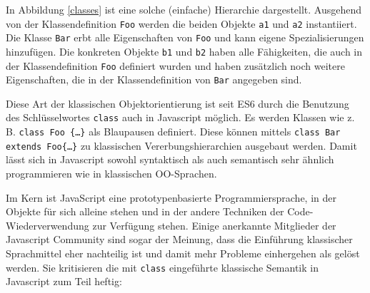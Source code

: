 In Abbildung \ref{classes} ist eine solche (einfache) Hierarchie dargestellt. Ausgehend von der Klassendefinition \texttt{Foo} werden die beiden Objekte \texttt{a1} und \texttt{a2} instantiiert. Die Klasse \texttt{Bar} erbt alle Eigenschaften von \texttt{Foo} und kann eigene Spezialisierungen hinzufügen. Die konkreten Objekte \texttt{b1} und \texttt{b2} haben alle Fähigkeiten, die auch in der Klassendefinition \texttt{Foo} definiert wurden und haben zusätzlich noch weitere Eigenschaften, die in der Klassendefinition von \texttt{Bar} angegeben sind.

Diese Art der klassischen Objektorientierung ist seit ES6
durch die Benutzung des Schlüsselwortes \texttt{class} auch in Javascript möglich. Es werden Klassen wie z. B. \texttt{class Foo \{\ldots \}} als Blaupausen definiert. Diese können mittels \texttt{class Bar extends Foo\{\ldots \}} zu klassischen Vererbungshierarchien ausgebaut werden. Damit lässt sich in Javascript sowohl syntaktisch als auch semantisch sehr ähnlich programmieren wie in klassischen OO-Sprachen.

\skippingparagraph

Im Kern ist JavaScript eine prototypenbasierte Programmiersprache, in der Objekte für sich alleine stehen und in der andere Techniken der Code-Wiederverwendung zur Verfügung stehen. Einige anerkannte Mitglieder der Javascript Community sind sogar der Meinung, dass die Einführung klassischer Sprachmittel eher nachteilig ist und damit mehr Probleme einhergehen als gelöst werden. Sie kritisieren die mit \texttt{class} eingeführte klassische Semantik in Javascript zum Teil heftig:


